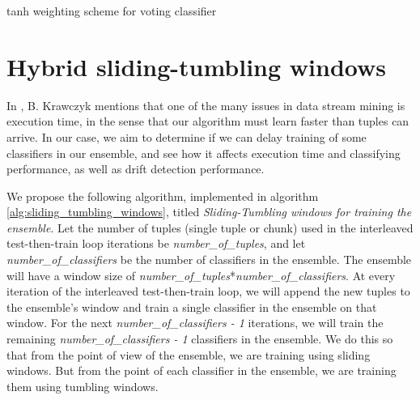 \begin{algorithm}
    \caption{\label{alg:new_voting_scheme}tanh weighting scheme for voting classifier}
\end{algorithm}




\section{Hybrid sliding-tumbling windows\label{section:hybrid-windows}}
In \cite{KRAWCZYK2017132}, B. Krawczyk mentions that one of the many issues in data stream mining is execution time, in the sense that our algorithm must learn faster than tuples can arrive. In our case, we aim to determine if we can delay training of some classifiers in our ensemble, and see how it affects execution time and classifying performance, as well as drift detection performance.

We propose the following algorithm, implemented in algorithm \ref{alg:sliding_tumbling_windows}, titled \textit{Sliding-Tumbling windows for training the ensemble}.
Let the number of tuples (single tuple or chunk) used in the interleaved test-then-train loop iterations be \textit{number\_of\_tuples}, and let \textit{number\_of\_classifiers} be the number of classifiers in the ensemble. The ensemble will have a window size of \textit{number\_of\_tuples}*\textit{number\_of\_classifiers}. At every iteration of the interleaved test-then-train loop, we will append the new tuples to the ensemble's window and train a single classifier in the ensemble on that window. For the next \textit{number\_of\_classifiers - 1} iterations, we will train the remaining \textit{number\_of\_classifiers - 1} classifiers in the ensemble. We do this so that from the point of view of the ensemble, we are training using sliding windows. But from the point of each classifier in the ensemble, we are training them using tumbling windows.

